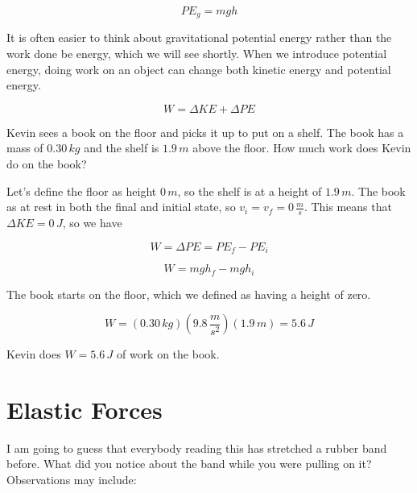 \documentclass[12pt]{book}
\begin{document}
\begin{equation}
PE_g = mgh
\end{equation}

It is often easier to think about gravitational potential energy rather than the work done be energy, which we will see shortly. When we introduce potential energy, doing work on an object can change both kinetic energy and potential energy.

\begin{equation}
W = \Delta KE + \Delta PE
\end{equation}

\begin{exampleblock}

Kevin sees a book on the floor and picks it up to put on a shelf. The book has a mass of $0.30 \, kg$ and the shelf is $1.9 \, m$ above the floor. How much work does Kevin do on the book?

\hspace{10pt}

Let's define the floor as height $0 \, m$, so the shelf is at a height of $1.9 \, m$. The book as at rest in both the final and initial state, so $v_i = v_f = 0 \, \frac{m}{s}$. This means that $\Delta KE = 0 \, J$, so we have

\begin{equation}
W = \Delta PE = PE_f - PE_i
\end{equation}

\begin{equation}
W = mgh_f - mgh_i
\end{equation}

The book starts on the floor, which we defined as having a height of zero.

\begin{equation}
W = (0.30 \, kg) (9.8 \, \frac{m}{s^2}) (1.9 \, m) = 5.6 \, J
\end{equation}

Kevin does $W = 5.6 \, J$ of work on the book.

\end{exampleblock}

\section{Elastic Forces}

I am going to guess that everybody reading this has stretched a rubber band before. What did you notice about the band while you were pulling on it? Observations may include:
\end{document}
